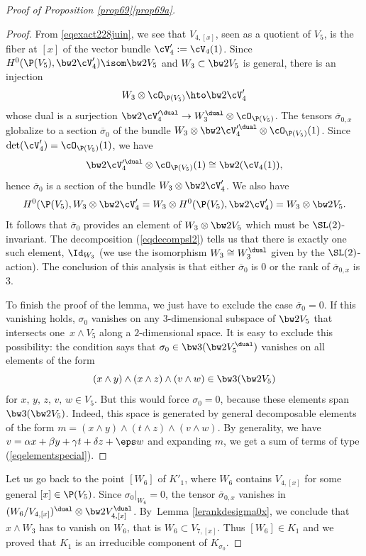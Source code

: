 \begin{proof}[Proof of Proposition \ref{prop69}\eqref{prop69a}]
\begin{proof}
From \eqref{eqexact228juin}, we see that $V_{4,[x]}$, seen as a quotient of $V_5$, is the fiber at $[x]$ of the vector bundle $\cV'_4:=\cV_4(1)$. Since $H^0(\P(V_5),\bw2\cV'_4)\isom \bw2V_5$ and $W_3\subset \bw2V_5$ is general, there is an injection
\[
 W_3\otimes \cO_{\P(V_5)}\hto \bw2\cV'_4
\]
whose dual is a
surjection $\bw2\cV_4^{\prime\dual}\to W_3^\dual\otimes \cO_{\P(V_5)}$. The tensors $\overline{\sigma}_{0,x} $
globalize to a section $\overline{\sigma}_0$ of the bundle $W_3\otimes \bw2\cV_4^{\prime\dual}\otimes \cO_{\P(V_5)}(1)$.
Since $\det(\cV'_4)=\cO_{\P(V_5)}(1)$, we have
\[
\bw2\cV_4^{\prime\dual}\otimes \cO_{\P(V_5)}(1)\cong \bw2(\cV_4(1)),
\]
hence $\overline{\sigma}_0$ is a section of the bundle $W_3\otimes \bw2\cV_4'$.
We also have
\[
H^0(\P(V_5),W_3\otimes \bw2\cV_4'=W_3\otimes H^0(\P(V_5),\bw2\cV_4')=W_3\otimes \bw2V_5.
\]
It follows that $\overline{\sigma}_0$ provides an element of $W_3\otimes \bw2V_5$ which must
be $\SL(2)$-invariant. The decomposition (\ref{eqdecompsl2}) tells us that there is exactly
one such element, $\Id_{W_3}$ (we use the isomorphism $W_3\cong W_3^\dual$ given by the $\SL(2)$-action).
The conclusion of this analysis is that either $\overline{\sigma}_0$ is $0$ or the rank of $\overline{\sigma}_{0,x}$ is $3$.

To finish the proof of the lemma, we just have to exclude the case
$\overline{\sigma}_0=0$. If this vanishing holds, $\sigma_0$ vanishes on any $3$-dimensional subspace of $\bw2 V_5$ that intersects
one~$x\wedge V_5$ along a $2$-dimensional space. It is easy to exclude this possibility: the condition says that $\sigma_0\in\bw3(\bw2V_5^\dual)$ vanishes on all elements of the form
\begin{equation}
\label{eqelementspecial}
(x\wedge y)\wedge (x\wedge z)\wedge( v\wedge w)\in \bw3(\bw2V_5)
\end{equation}
for $x,\,y,\,z,\,v,\,w\in V_5$. But this would force $\sigma_0=0$, because these elements span $\bw3(\bw2V_5)$. Indeed,
this space is generated by general
decomposable elements of the form $m=(x\wedge y)\wedge (t\wedge z)\wedge( v\wedge w)$. By generality, we have
$v=\alpha x+\beta y+\gamma t+\delta z+\eps w$ and expanding $m$, we get a sum of terms of
type (\ref{eqelementspecial}).
\end{proof}

Let us go back to the point $[W_6]$ of $K'_1$, where $W_6$ contains $ V_{4,[x]}$ for some general $[x]\in\P(V_5)$. Since $\sigma_{0}\vert_{ W_6}=0$, the
tensor $\overline{\sigma}_{0,x}$ vanishes in $(W_6/V_{4,[x]})^\dual\otimes \bw2V_{4,[x]}^\dual$.
By~Lemma \ref{lerankdesigma0x}, we conclude that $x\wedge W_3$ has to vanish on $W_6$, that is
$W_6\subset V_{7,[x]}$. Thus $[W_6]\in K_1$ and we proved that $K_1$ is an irreducible component
of $K_{\sigma_0}$.


\end{proof}

